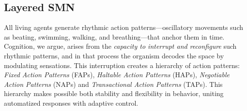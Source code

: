 \subsection{Layered SMN}
\label{subsec:layered}

All living agents generate rhythmic action patterns—oscillatory movements such as beating,  swimming, walking, and breathing—that anchor them in time. Cognition, we argue, arises from  the \emph{capacity to interrupt and reconfigure} such rhythmic patterns, and in that process the organism decodes the space by modulating sensations. This interruption  creates a hierarchy of action patterns:  \emph{Fixed Action Patterns} (FAPs), \emph{Haltable Action Patterns} (HAPs), \emph{Negotiable Action Patterns} (NAPs) and  \emph{Transactional Action Patterns} (TAPs).  This hierarchy makes possible both stability and flexibility in behavior, uniting automatized responses with adaptive control.   
